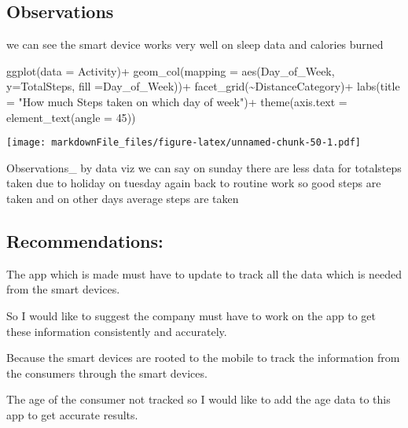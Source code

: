 \documentclass[
]{article}
\newenvironment{Shaded}{\begin{snugshade}}{\end{snugshade}}
\newcommand{\AttributeTok}[1]{\textcolor[rgb]{0.77,0.63,0.00}{#1}}
\newcommand{\DecValTok}[1]{\textcolor[rgb]{0.00,0.00,0.81}{#1}}
\newcommand{\FunctionTok}[1]{\textcolor[rgb]{0.00,0.00,0.00}{#1}}
\newcommand{\NormalTok}[1]{#1}
\newcommand{\SpecialCharTok}[1]{\textcolor[rgb]{0.00,0.00,0.00}{#1}}
\newcommand{\StringTok}[1]{\textcolor[rgb]{0.31,0.60,0.02}{#1}}
\begin{document}
\hypertarget{observations}{%
\subsection{Observations}\label{observations}}

we can see the smart device works very well on sleep data and calories
burned

\begin{Shaded}
\begin{Highlighting}[]
\FunctionTok{ggplot}\NormalTok{(}\AttributeTok{data =}\NormalTok{ Activity)}\SpecialCharTok{+}
  \FunctionTok{geom\_col}\NormalTok{(}\AttributeTok{mapping =} \FunctionTok{aes}\NormalTok{(Day\_of\_Week, }\AttributeTok{y=}\NormalTok{TotalSteps, }\AttributeTok{fill =}\NormalTok{Day\_of\_Week))}\SpecialCharTok{+}
  \FunctionTok{facet\_grid}\NormalTok{(}\SpecialCharTok{\textasciitilde{}}\NormalTok{DistanceCategory)}\SpecialCharTok{+}
  \FunctionTok{labs}\NormalTok{(}\AttributeTok{title =} \StringTok{"How much Steps taken on which day of week"}\NormalTok{)}\SpecialCharTok{+}
  \FunctionTok{theme}\NormalTok{(}\AttributeTok{axis.text =} \FunctionTok{element\_text}\NormalTok{(}\AttributeTok{angle =} \DecValTok{45}\NormalTok{))}
\end{Highlighting}
\end{Shaded}

\texttt{[image: markdownFile\_files/figure-latex/unnamed-chunk-50-1.pdf]}

Observations\_ by data viz we can say on sunday there are less data for
totalsteps taken due to holiday on tuesday again back to routine work so
good steps are taken and on other days average steps are taken

\hypertarget{recommendations}{%
\subsection{Recommendations:}\label{recommendations}}

The app which is made must have to update to track all the data which is
needed from the smart devices.

So I would like to suggest the company must have to work on the app to
get these information consistently and accurately.

Because the smart devices are rooted to the mobile to track the
information from the consumers through the smart devices.

The age of the consumer not tracked so I would like to add the age data
to this app to get accurate results.
\end{document}
